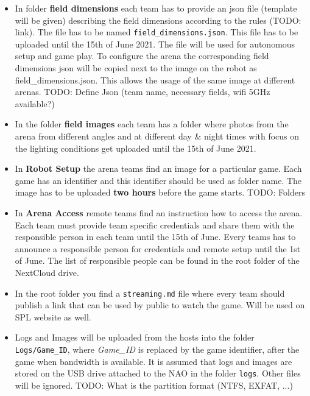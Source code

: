 \begin{itemize}
    \item In folder \textbf{field dimensions} each team has to provide an json file (template will be given) describing the field dimensions according to the rules (TODO: link). The file has to be named \texttt{field\_dimensions.json}. This file has to be uploaded until the 15th of June 2021. The file will be used for autonomous setup and game play. To configure the arena the corresponding field dimensions json will be copied next to the image on the robot as field\_dimensions.json. This allows the usage of the same image at different arenas.
    TODO: Define Json (team name, necessary fields, wifi 5GHz available?)
    \item  In the folder \textbf{field images} each team has a folder where photos from the arena from different angles and at different day \& night times with focus on the lighting conditions get uploaded until the 15th of June 2021.
    \item In \textbf{Robot Setup} the arena teams find an image for a particular game. Each game has an identifier and this identifier should be used as folder name. The image has to be uploaded \textbf{two hours} before the game starts. TODO: Folders
    \item In \textbf{Arena Access} remote teams find an instruction how to access the arena. Each team must provide team specific credentials and share them with the responsible person in each team until the 15th of June. Every teams has to announce a responsible person for credentials and remote setup until the 1st of June. The list of responsible people can be found in the root folder of the NextCloud drive. 
    \item In the root folder you find a \texttt{streaming.md} file where every team should publish a link that can be used by public to watch the game. Will be used on SPL website as well.
    \item Logs and Images will be uploaded from the hosts into the folder \texttt{Logs/Game\_ID}, where \textit{Game\_ID} is replaced by the game identifier, after the game when bandwidth is available. It is assumed that logs and images are stored on the USB drive attached to the NAO in the folder \texttt{logs}. Other files will be ignored. TODO: What is the partition format (NTFS, EXFAT, ...)
\end{itemize}

